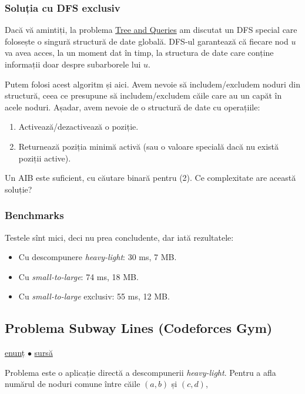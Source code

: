 \documentclass[../main.tex]{subfiles}
\begin{document}
\subsubsection*{Soluția cu DFS exclusiv}

Dacă vă amintiți, la problema \hyperref[problem:tree-and-queries]{Tree and Queries} am discutat un DFS special care folosește o singură structură de date globală. DFS-ul garantează că fiecare nod $u$ va avea acces, la un moment dat în timp, la structura de date care conține informații doar despre subarborele lui $u$.

Putem folosi acest algoritm și aici. Avem nevoie să includem/excludem noduri din structură, ceea ce presupune să includem/excludem căile care au un capăt în acele noduri. Așadar, avem nevoie de o structură de date cu operațiile:

\begin{enumerate}
  \item Activează/dezactivează o poziție.
  \item Returnează poziția minimă activă (sau o valoare specială dacă nu există poziții active).
\end{enumerate}

Un AIB este suficient, cu căutare binară pentru (2). Ce complexitate are această soluție?

\subsubsection*{Benchmarks}

Testele sînt mici, deci nu prea concludente, dar iată rezultatele:

\begin{itemize}
  \item Cu descompunere \textit{heavy-light}: 30 ms, 7 MB.
  \item Cu \textit{small-to-large}: 74 ms, 18 MB.
  \item Cu \textit{small-to-large} exclusiv: 55 ms, 12 MB.
\end{itemize}


\subsection{Problema Subway Lines (Codeforces Gym)}
\label{problem:subway-lines}

\href{https://codeforces.com/gym/101908/problem/L}{enunț}
$\bullet$
\hyperref[code:subway-lines]{sursă}

Problema este o aplicație directă a descompunerii \textit{heavy-light}. Pentru a afla numărul de noduri comune între căile $(a, b)$ și $(c, d)$,
\end{document}
